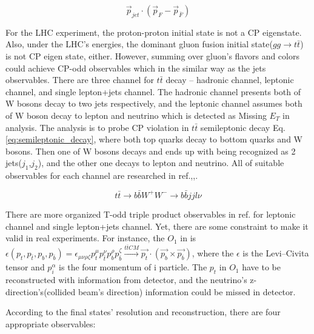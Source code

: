 		\begin{equation}
		\vec{p}_{jet} \cdot ( \vec{p}_F - \vec{p}_{\bar{F}} )
		\label{eq:3vec_Teven}
		\end{equation}
		\FloatBarrier


		For the LHC experiment, the proton-proton initial state is not a CP eigenstate. Also, under the LHC's energies, the dominant gluon fusion initial state($gg \rightarrow t\bar{t}$) is not CP eigen state, either. However, summing over gluon's flavors and colors could achieve CP-odd observables which in the similar way as the jets observables. There are three channel for $t\bar{t}$ decay -- hadronic channel, leptonic channel, and single lepton+jets channel. The hadronic channel presents both of W bosons decay to two jets respectively, and the leptonic channel assumes both of W boson decay to lepton and neutrino which is detected as Missing $E_T$ in analysis. The analysis is to probe CP violation in $t\bar{t}$ semileptonic decay Eq.\ref{eq:semileptonic_decay}, where both top quarks decay to bottom quarks and W bosons. Then one of W bosons decays and ends up with being recognized as 2 jets($j_1$,$j_2$), and the other one decays to lepton and neutrino. All of suitable observables for each channel are researched in ref.\cite{PhysRevD.80.034013},\cite{PhysRevD.81.034013},\cite{Hayreter:2015ryk}.

		\begin{equation}
		t\bar{t} \rightarrow b\bar{b} W^+W^- \rightarrow b\bar{b} jj l \nu
		\label{eq:semileptonic_decay}
		\end{equation}
		\FloatBarrier

		There are more organized T-odd triple product observables in ref.\cite{Hayreter:2015ryk} for leptonic channel and single lepton+jets channel. Yet, there are some constraint to make it valid in real experiments. For instance, the $O_1$ in\cite{Hayreter:2015ryk} is $\epsilon(p_t,p_{\bar{t}},p_b,p_{\bar{b}}) = \epsilon_{\mu \nu \rho \zeta}p_t^{\mu}p_{\bar{t}}^{\nu}p_b^{\rho}p_{\bar{b}}^{\zeta} \xrightarrow[]{t\overline{t}CM} \vec{p_t} \cdot ( \vec{p_b} \times \vec{p_{\overline{b}}} )$, where the $\epsilon$ is the Levi–Civita tensor and $p_i^{\alpha}$ is the four momentum of i particle. The $p_t$ in $O_1$ have to be reconstructed with information from detector, and the neutrino's z-direction's(collided beam's direction) information could be missed in detector.

		According to the final states' resolution and reconstruction, there are four appropriate observables:

